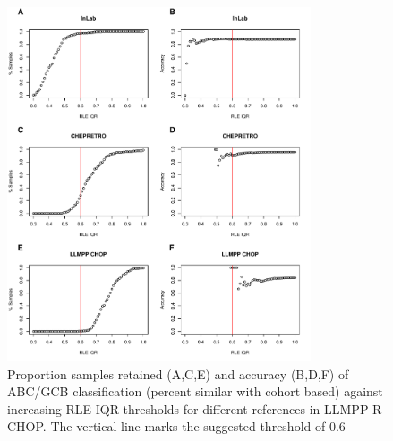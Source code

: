\begin{figure}
	\begin{center}
		\includegraphics[width=0.8\textwidth]{figures/RCHOP_rle_classification_abcgcb.pdf}
	\end{center}
	\caption{Proportion samples retained (A,C,E) and accuracy (B,D,F) of ABC/GCB classification (percent similar with cohort based) against increasing RLE IQR thresholds for different references in LLMPP R-CHOP. The vertical line marks the suggested threshold of 0.6}
	\label{fig:RCHOP_rle_clas_abcgcb}
\end{figure}

